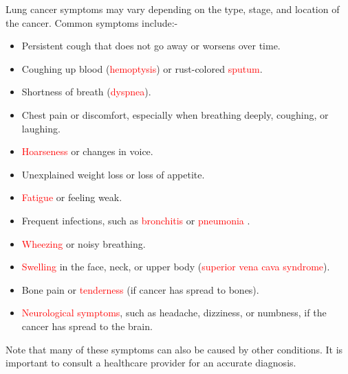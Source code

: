 Lung cancer symptoms may vary depending on the type, stage, and location of the cancer. Common symptoms include:-

\begin{itemize}
    \item Persistent cough that does not go away or worsens over time.
    \item Coughing up blood (\textcolor{red}{hemoptysis}) or rust-colored \textcolor{red}{sputum}.
    \item Shortness of breath (\textcolor{red}{dyspnea}).
    \item Chest pain or discomfort, especially when breathing deeply, coughing, or laughing.
    \item \textcolor{red}{Hoarseness} or changes in voice.
    \item Unexplained weight loss or loss of appetite.
    \item \textcolor{red}{Fatigue} or feeling weak.
    \item Frequent infections, such as \textcolor{red}{bronchitis} or \textcolor{red}{pneumonia} .
    \item \textcolor{red}{Wheezing} or noisy breathing.
    \item \textcolor{red}{Swelling} in the face, neck, or upper body (\textcolor{red}{superior vena cava syndrome}).
    \item Bone pain or \textcolor{red}{tenderness} (if cancer has spread to bones).
    \item \textcolor{red}{Neurological symptoms}, such as headache, dizziness, or numbness, if the cancer has spread to the brain.
\end{itemize}

Note that many of these symptoms can also be caused by other conditions. It is important to consult a healthcare provider for an accurate diagnosis.
\newpage